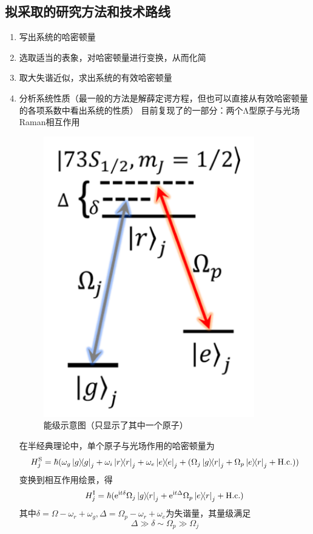 \documentclass[fontset=windows,toc=true,type=bachelor,stage=opening,campus=weihai]{hithesisart}
\begin{document}
\subsection{拟采取的研究方法和技术路线}
\begin{enumerate}
\item 写出系统的哈密顿量
\item 选取适当的表象，对哈密顿量进行变换，从而化简
\item 取大失谐近似，求出系统的有效哈密顿量
\item 分析系统性质（最一般的方法是解薛定谔方程，但也可以直接从有效哈密顿量的各项系数中看出系统的性质）
目前复现了\cite{PhysRevA.105.032417}的一部分：两个Λ型原子与光场Raman相互作用
\begin{figure}
\centering
\includegraphics[height=0.5\textheight]{pra-energy-level}
\caption{能级示意图（只显示了其中一个原子）}
\label{fig:pra-energy-level}
\end{figure}


在半经典理论中，单个原子与光场作用的哈密顿量为
\begin{equation}
H_j^\mathrm{S}=\hbar(\omega_g\ketbra{g}{g}_j+\omega_i\ketbra{r}{r}_j+\omega_e\ketbra{e}{e}_j+(\Omega_j\ketbra{g}{r}_j+\Omega_p\ketbra{e}{r}_j+\mathrm{H.c.}))
\end{equation}
变换到相互作用绘景，得
\begin{equation}\label{}
H_j^\mathrm{I}=\hbar(\mathrm{e}^{\mathrm{i}t\delta}\Omega_j\ketbra{g}{r}_j+\mathrm{e}^{\mathrm{i}t\Delta}\Omega_p\ketbra{e}{r}_j+\mathrm{H.c.})
\end{equation}
其中$ \delta=\Omega-\omega_r+\omega_g,\Delta=\Omega_p-\omega_r+\omega_e
 $为失谐量，其量级满足
\begin{equation}
\Delta\gg\delta\sim\Omega_p\gg\Omega_j
\end{equation}



\end{enumerate}
\end{document}
